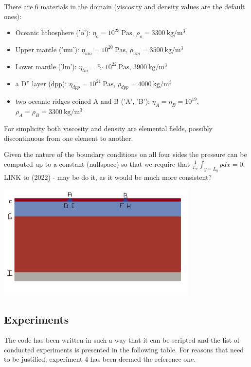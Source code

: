 There are 6 materials in the domain (viscosity and density values are the default ones):
\begin{itemize}
\item Oceanic lithosphere ('o'):  
$\eta_o=10^{23}~\si{\pascal\second}$, $\rho_o=3300~\si{\kg\per\cubic\meter}$
\item Upper mantle ('um'): 
$\eta_{um}=10^{20}~\si{\pascal\second}$, $\rho_{um}=3500~\si{\kg\per\cubic\meter}$
\item Lower mantle ('lm'): 
$\eta_{lm}=5\cdot 10^{22}~\si{\pascal\second}$, $ 3900~\si{\kg\per\cubic\meter}$ 
\item a D'' layer (dpp): 
$\eta_{dpp}=10^{21}~\si{\pascal\second}$,   $\rho_{dpp}=4000~\si{\kg\per\cubic\meter}$
\item two oceanic ridges coined A and B ('A', 'B'): 
$\eta_A=\eta_B=10^{19}$, $\rho_A=\rho_B=3300~\si{\kg\per\cubic\meter}$
\end{itemize}
For simplicity both viscosity and density are elemental fields, possibly discontinuous from 
one element to another.

Given the nature of the boundary conditions on all four sides 
the pressure can be computed up to a constant (nullspace)
so that we require that $\frac{1}{L_x}\int_{y=L_y} p dx =0$.
LINK to \textcite{joma22} (2022) - may be do it, as it would be 
much more consistent?

\begin{center}
\includegraphics[width=10cm]{python_codes/fieldstone_148/images/setup}
\end{center}


\subsection*{Experiments}

The code has been written in such a 
way that it can be scripted and the list of conducted experiments is presented in the following 
table. For reasons that need to be justified, experiment 4 has been deemed the reference one.

